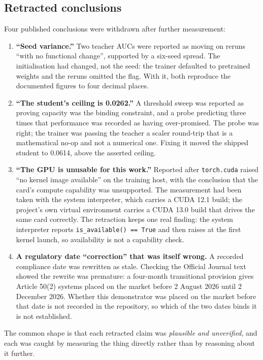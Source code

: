 \documentclass[11pt,a4paper]{article}
\begin{document}
\subsection{Retracted conclusions}
Four published conclusions were withdrawn after further measurement:
\begin{enumerate}[label=(\alph*)]
  \item \textbf{``Seed variance.''} Two teacher AUCs were reported as moving on reruns ``with no
        functional change'', supported by a six-seed spread. The initialisation had changed, not the
        seed: the trainer defaulted to pretrained weights and the reruns omitted the flag. With it,
        both reproduce the documented figures to four decimal places.
  \item \textbf{``The student's ceiling is 0.0262.''} A threshold sweep was reported as proving
        capacity was the binding constraint, and a probe predicting three times that performance was
        recorded as having over-promised. The probe was right; the trainer was passing the teacher a
        scaler round-trip that is a mathematical no-op and not a numerical one. Fixing it moved the
        shipped student to 0.0614, above the asserted ceiling.
  \item \textbf{``The GPU is unusable for this work.''} Reported after
        \texttt{torch.cuda} raised ``no kernel image available'' on the training host, with the
        conclusion that the card's compute capability was unsupported. The measurement had been taken
        with the system interpreter, which carries a CUDA 12.1 build; the project's own virtual
        environment carries a CUDA 13.0 build that drives the same card correctly. The retraction
        keeps one real finding: the system interpreter reports
        \texttt{is\_available() == True} and then raises at the first kernel launch, so
        availability is not a capability check.
  \item \textbf{A regulatory date ``correction'' that was itself wrong.} A recorded compliance date
        was rewritten as stale. Checking the Official Journal text showed the rewrite was premature:
        a four-month transitional provision gives Article 50(2) systems placed on the market before
        2 August 2026 until 2 December 2026. Whether this demonstrator was placed on the market
        before that date is not recorded in the repository, so which of the two dates binds it is
        not established.
\end{enumerate}
The common shape is that each retracted claim was \emph{plausible and unverified}, and each was
caught by measuring the thing directly rather than by reasoning about it further.
\end{document}
